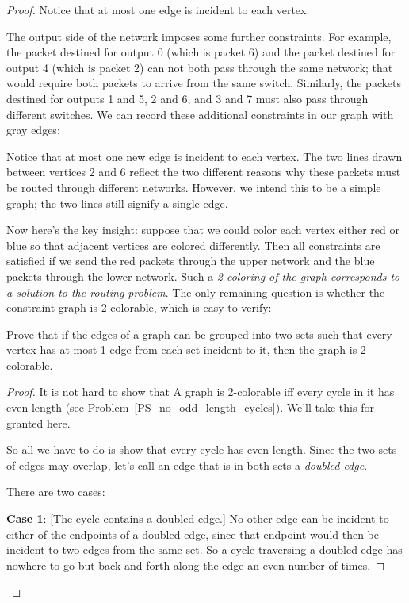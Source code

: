 \begin{proof}
Notice that at most one edge is incident to each vertex.

The output side of the network imposes some further constraints.  For
example, the packet destined for output 0 (which is packet 6) and the
packet destined for output 4 (which is packet 2) can not both pass
through the same network; that would require both packets to arrive
from the same switch.  Similarly, the packets destined for outputs 1
and 5, 2 and 6, and 3 and 7 must also pass through different switches.
We can record these additional constraints in our graph with gray
edges:
\begin{center}
\end{center}

Notice that at most one new edge is incident to each vertex.
The two lines drawn between vertices 2 and 6 reflect the two different
reasons why these packets must be routed through different networks.
However, we intend this to be a simple graph; the two lines still
signify a single edge.

Now here's the key insight: suppose that we could color each vertex
either red or blue so that adjacent vertices are colored differently.
Then all constraints are satisfied if we send the red packets through
the upper network and the blue packets through the lower network.
Such a \textit{2-coloring of the graph corresponds to a solution to
  the routing problem}.  The only remaining question is whether the
constraint graph is 2-colorable, which is easy to verify:

\begin{lemma}\label{deg1-union}
  Prove that if the edges of a graph can be grouped into two sets such
  that every vertex has at most 1 edge from each set incident to it, then
  the graph is 2-colorable.
\end{lemma}

\begin{proof}
It is not hard to show that A graph is 2-colorable iff every cycle in
it has even length (see Problem~\ref{PS_no_odd_length_cycles}).  We'll
take this for granted here.

  \iffalse We know from Theorem~\ref{odd-cycle} that \fi
So all we have to do is show that every cycle has even length.  Since
the two sets of edges may overlap, let's call an edge that is in both
sets a \emph{doubled edge}.

There are two cases:

  \textbf{Case 1}: [The cycle contains a doubled edge.]  No other edge can
  be incident to either of the endpoints of a doubled edge, since that
  endpoint would then be incident to two edges from the same set.  So a
  cycle traversing a doubled edge has nowhere to go but back and forth
  along the edge an even number of times.


\end{proof}
\end{proof}
